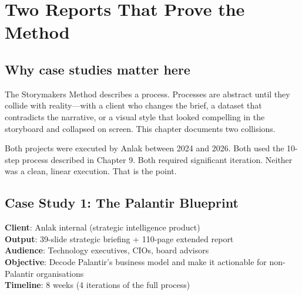 
\section{Two Reports That Prove the Method}



\subsection{Why case studies matter here}

The Storymakers Method describes a process. Processes are abstract until they collide with reality---with a client who changes the brief, a dataset that contradicts the narrative, or a visual style that looked compelling in the storyboard and collapsed on screen. This chapter documents two collisions.

Both projects were executed by Anlak between 2024 and 2026. Both used the 10-step process described in Chapter 9. Both required significant iteration. Neither was a clean, linear execution. That is the point.

\subsection{Case Study 1: The Palantir Blueprint}

\begin{casebox}
\textbf{Client}: Anlak internal (strategic intelligence product)\\
\textbf{Output}: 39-slide strategic briefing + 110-page extended report\\
\textbf{Audience}: Technology executives, CIOs, board advisors\\
\textbf{Objective}: Decode Palantir's business model and make it actionable for non-Palantir organisations\\
\textbf{Timeline}: 8 weeks (4 iterations of the full process)
\end{casebox}

